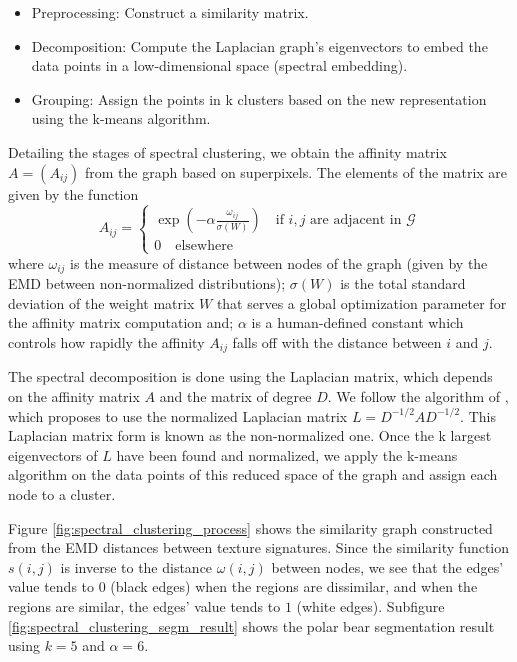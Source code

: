 \begin{itemize}
	\item Preprocessing: Construct a similarity matrix.
	\item Decomposition: Compute the Laplacian graph's eigenvectors to embed the data points in a low-dimensional space (spectral embedding).
	\item Grouping: Assign the points in k clusters based on the new representation using the k-means algorithm.
\end{itemize}

Detailing the stages of spectral clustering, we obtain the affinity matrix $A = (A_{ij})$ from the graph based on superpixels. The elements of the matrix are given by the function
\begin{equation}	
	A_{ij}= 
	\begin{cases}
		\exp{\left(- \alpha \frac{\omega_{ij}}{\sigma(W)}\right)}  \quad \text{if $i, j$ are adjacent in $\mathcal{G}$} \\
		0 \quad \text{elsewhere}
	\end{cases}	 
\end{equation}
where $\omega_{ij}$ is the measure of distance between nodes of the graph (given by the EMD between non-normalized distributions); $\sigma(W)$ is the total standard deviation of the weight matrix $W$ that serves a global optimization parameter for the affinity matrix computation and; $\alpha$ is a human-defined constant which controls how rapidly the affinity $A_{ij}$ falls off with the distance between $i$ and $j$.

The spectral decomposition is done using the Laplacian matrix, which depends on the affinity matrix $A$ and the matrix of degree $D$. We follow the algorithm of \cite{Ng.Jordan.ea:NIPS:2001}, which proposes to use the normalized Laplacian matrix $L = D^{-1/2} A D^{-1/2}$. This Laplacian matrix form is known as the non-normalized one. Once the k largest eigenvectors of $ L $ have been found and normalized, we apply the k-means algorithm on the data points of this reduced space of the graph and assign each node to a cluster.

Figure \ref{fig:spectral_clustering_process} shows the similarity graph constructed from the EMD distances between texture signatures. Since the similarity function $s(i, j)$ is inverse to the distance $\omega (i, j)$ between nodes, we see that the edges' value tends to $0$ (black edges) when the regions are dissimilar, and when the regions are similar, the edges' value tends to $1$ (white edges). Subfigure \ref{fig:spectral_clustering_segm_result} shows the polar bear segmentation result using $k = 5$ and $\alpha = 6$.

